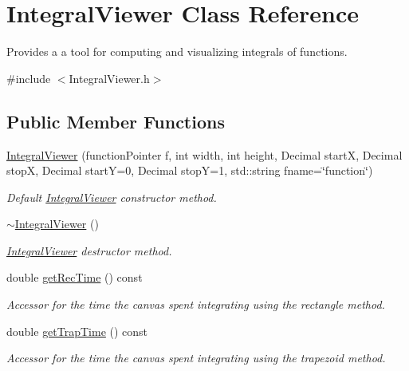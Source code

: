 \hypertarget{class_integral_viewer}{}\section{Integral\+Viewer Class Reference}
\label{class_integral_viewer}


Provides a a tool for computing and visualizing integrals of functions.  




{\ttfamily \#include $<$Integral\+Viewer.\+h$>$}

\subsection*{Public Member Functions}
\begin{DoxyCompactItemize}
\item 
\hyperlink{class_integral_viewer_adecb5be9f7e9a78ed92012d03fda60a4}{Integral\+Viewer} (function\+Pointer f, int width, int height, Decimal start\+X, Decimal stop\+X, Decimal start\+Y=0, Decimal stop\+Y=1, std\+::string fname=\char`\"{}function\char`\"{})
\begin{DoxyCompactList}\small\item\em Default \hyperlink{class_integral_viewer}{Integral\+Viewer} constructor method. \end{DoxyCompactList}\item 
\hyperlink{class_integral_viewer_ab7a08c6cd6c29ad8eea8e7775ca27e1a}{$\sim$\+Integral\+Viewer} ()
\begin{DoxyCompactList}\small\item\em \hyperlink{class_integral_viewer}{Integral\+Viewer} destructor method. \end{DoxyCompactList}\item 
double \hyperlink{class_integral_viewer_aea352806c209ac68173cd88eb0f8059a}{get\+Rec\+Time} () const 
\begin{DoxyCompactList}\small\item\em Accessor for the time the canvas spent integrating using the rectangle method. \end{DoxyCompactList}\item 
double \hyperlink{class_integral_viewer_a36af219f38cd53b0eb660725a550deed}{get\+Trap\+Time} () const 
\begin{DoxyCompactList}\small\item\em Accessor for the time the canvas spent integrating using the trapezoid method. \end{DoxyCompactList}\item 

\end{DoxyCompactItemize}
